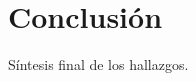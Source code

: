 \documentclass[10pt, a4paper]{article}
\begin{document}
\section{Conclusión}
\label{sec:conclusion}
Síntesis final de los hallazgos.

\printbibliography

\end{document}
